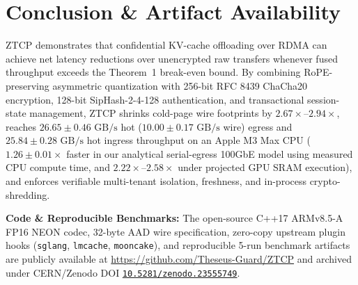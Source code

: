 \documentclass[10pt,twocolumn]{article}
\begin{document}
\section{Conclusion \& Artifact Availability}
ZTCP demonstrates that confidential KV-cache offloading over RDMA can achieve net latency reductions over unencrypted raw transfers whenever fused throughput exceeds the Theorem~1 break-even bound. By combining RoPE-preserving asymmetric quantization with 256-bit RFC 8439 ChaCha20 encryption, 128-bit SipHash-2-4-128 authentication, and transactional session-state management, ZTCP shrinks cold-page wire footprints by $2.67\times$--$2.94\times$, reaches $26.65 \pm 0.46\text{ GB/s}$ hot ($10.00 \pm 0.17\text{ GB/s}$ wire) egress and $25.84 \pm 0.28\text{ GB/s}$ hot ingress throughput on an Apple M3 Max CPU ($1.26 \pm 0.01\times$ faster in our analytical serial-egress 100GbE model using measured CPU compute time, and $2.22\times$--$2.58\times$ under projected GPU SRAM execution), and enforces verifiable multi-tenant isolation, freshness, and in-process crypto-shredding.

\textbf{Code \& Reproducible Benchmarks:} The open-source C++17 ARMv8.5-A FP16 NEON codec, 32-byte AAD wire specification, zero-copy upstream plugin hooks (\texttt{sglang}, \texttt{lmcache}, \texttt{mooncake}), and reproducible 5-run benchmark artifacts are publicly available at \url{https://github.com/Theseus-Guard/ZTCP} and archived under CERN/Zenodo DOI \href{https://doi.org/10.5281/zenodo.23555749}{\texttt{10.5281/zenodo.23555749}}.



\end{document}
